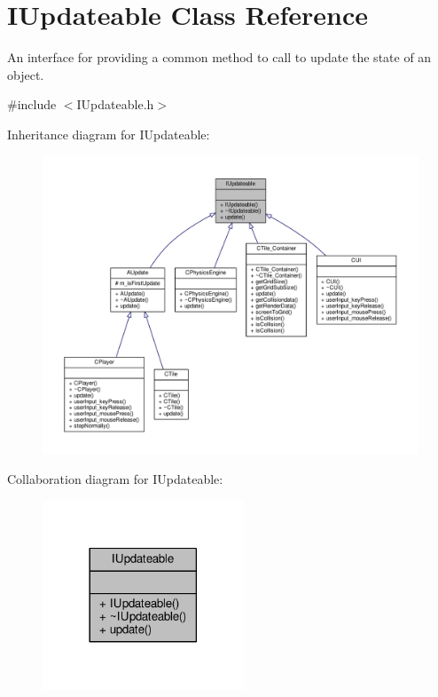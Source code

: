 \hypertarget{classIUpdateable}{\section{I\-Updateable Class Reference}
\label{classIUpdateable}
}


An interface for providing a common method to call to update the state of an object.  




{\ttfamily \#include $<$I\-Updateable.\-h$>$}



Inheritance diagram for I\-Updateable\-:\nopagebreak
\begin{figure}[H]
\begin{center}
\leavevmode
\includegraphics[width=350pt]{classIUpdateable__inherit__graph}
\end{center}
\end{figure}


Collaboration diagram for I\-Updateable\-:\nopagebreak
\begin{figure}[H]
\begin{center}
\leavevmode
\includegraphics[width=170pt]{classIUpdateable__coll__graph}
\end{center}
\end{figure}
